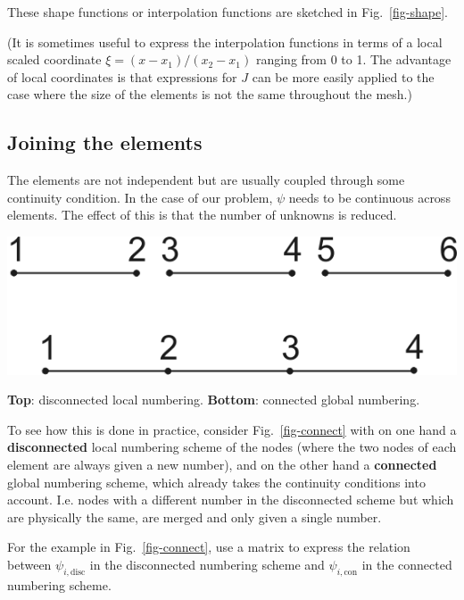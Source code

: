 These shape functions or interpolation functions are sketched in Fig.~\ref{fig-shape}.

(It is sometimes useful to express the interpolation functions in terms of a local scaled coordinate $\xi=(x-x_1)/(x_2-x_1)$ ranging from 0 to 1. The advantage of local coordinates is that expressions for $J$ can be more easily applied to the case where the size of the elements is not the same throughout the mesh.)

\subsection{Joining the elements}

The elements are not independent but are usually coupled through some continuity condition. In the case of our problem, $\psi$ needs to be continuous across elements. The effect of this is that the number of unknowns is reduced.

\begin{marginfigure}[0.5cm]
\centering
\includegraphics{numeric/figures/connect}
\caption{\textbf{Top}: disconnected local numbering. \textbf{Bottom}: connected global numbering.}
\label{fig-connect}
\end{marginfigure}

To see how this is done in practice, consider Fig.~\ref{fig-connect} with on one hand a \textbf{disconnected} local numbering scheme of the nodes (where the two nodes of each element are always given a new number), and on the other hand a \textbf{connected} global numbering scheme, which already takes the continuity conditions into account. I.e. nodes with a different number in the disconnected scheme but which are physically the same, are merged and only given a single number.

\begin{cue}
For the example in Fig.~\ref{fig-connect}, use a matrix to express the relation between $\psi_{i, \mathrm{disc}}$ in the disconnected numbering scheme and  $\psi_{i, \mathrm{con}}$ in the connected numbering scheme.
\end{cue}
  
